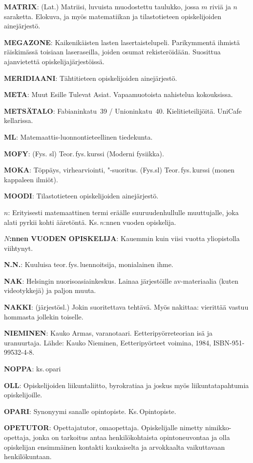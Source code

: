 \documentclass[../ala_hataile.tex]{subfiles}
\begin{document}
\textbf{MATRIX}: (Lat.) Matriisi, luvuista muodostettu
taulukko, jossa $m$ riviä ja $n$ saraketta.
Elokuva, ja myös matematiikan ja
tilastotieteen opiskelijoiden ainejärjestö.

\textbf{MEGAZONE}: Kaikenikäisten lasten lasertaistelupeli. Parikymmentä ihmistä räiskimässä
toisiaan laseraseilla, joiden osumat
rekisteröidään. Suosittua ajanvietettä opiskelijajärjestöissä.

\textbf{MERIDIAANI}: Tähtitieteen opiskelijoiden
ainejärjestö.

\textbf{META}: Muut Esille Tulevat Asiat. Vapaamuotoista
nahistelua kokouksissa.

\textbf{METSÄTALO}: Fabianinkatu~39 / Unioninkatu~40. Kielitieteilijöitä. UniCafe kellarissa.

\textbf{ML}: Matemaattis-luonnontieteellinen tiedekunta.

\textbf{MOFY}: (Fys. sl) Teor.\,fys.\,kurssi (Moderni
fysiikka).

\textbf{MOKA}: Töppäys, virhearviointi, "-suoritus.
(Fys.sl) Teor.\,fys.\,kurssi (monen kappaleen
ilmiöt).

\textbf{MOODI}: Tilastotieteen opiskelijoiden ainejärjestö.

$n$: Erityisesti matemaattinen termi
eräälle suuruudenhullulle muuttujalle,
joka alati pyrkii kohti ääretöntä. Ks.\,$n$:nnen
vuoden opiskelija.

\textbf{$N$:nnen VUODEN OPISKELIJA}: Kauemmin
kuin viisi vuotta yliopistolla viihtynyt.

\textbf{N.N.}: Kuuluisa teor.\,fys.\,luennoitsija, monialainen
ihme.

\textbf{NAK}: Helsingin nuorisoasiainkeskus. Lainaa
järjestöille av-materiaalia (kuten videotykkejä)
ja paljon muuta.

\textbf{NAKKI}: (järjestösl.) Jokin suoritettava
tehtävä. Myös nakittaa: vierittää vastuu
hommasta jollekin toiselle.

\textbf{NIEMINEN}: Kauko Armas, varanotaari.
Eetteripyörreteorian isä ja uranuurtaja.
Lähde: Kauko Nieminen, Eetteripyörteet
voimina, 1984, ISBN-951-99532-4-8.

\textbf{NOPPA}: ks.\,opari

\textbf{OLL}: Opiskelijoiden liikuntaliitto, byrokratiaa ja joskus myös liikunta\-tapahtumia
opiskelijoille.

\textbf{OPARI}: Synonyymi sanalle opintopiste.
Ks.\,Opintopiste.

\textbf{OPETUTOR}: Opettajatutor, omaopettaja.
Opiskelijalle nimetty nimikko-opettaja, jonka on tarkoitus antaa henkilökohtaista
opintoneuvontaa ja olla opiskelijan
ensimmäinen kontakti kaukaiselta ja
arvokkaalta vaikuttavaan henkilökuntaan.
\end{document}
